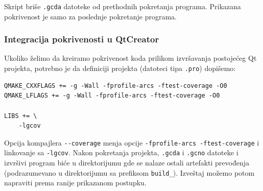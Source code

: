 Skript briše \texttt{.gcda} datoteke od prethodnih pokretanja programa. Prikazana pokrivenost je samo za poslednje pokretanje programa.

\subsubsection{Integracija pokrivenosti u QtCreator}\label{integracija-pokrivenosti-u-qtcreator}

Ukoliko želimo da kreiramo pokrivenost koda prilikom izvršavanja postojećeg Qt projekta, potrebno je da definiciji projekta (datoteci tipa \texttt{.pro}) dopišemo:

\begin{verbatim}
QMAKE_CXXFLAGS += -g -Wall -fprofile-arcs -ftest-coverage -O0
QMAKE_LFLAGS += -g -Wall -fprofile-arcs -ftest-coverage -O0

LIBS += \
    -lgcov
\end{verbatim}

Opcija kompajlera \texttt{-\/-coverage} menja opcije \texttt{-fprofile-arcs\ -ftest-coverage} i linkovanje sa \texttt{-lgcov}. Nakon pokretanja projekta, \texttt{.gcda} i \texttt{.gcno} datoteke i izvršivi program biće u direktorijumu gde se nalaze ostali artefakti prevođenja (podrazumevano u direktorijumu sa prefiksom \texttt{build\_}). Izveštaj možemo potom napraviti prema ranije prikazanom postupku.
